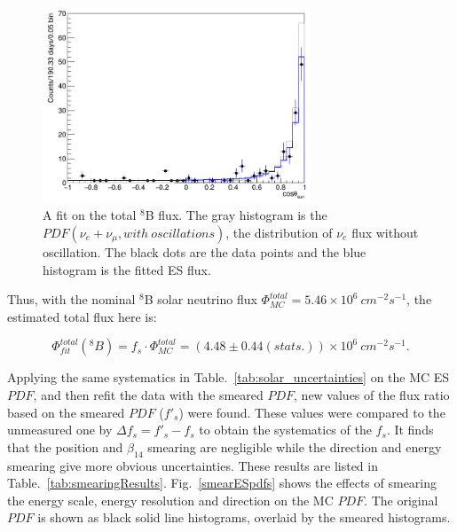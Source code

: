 \begin{figure}[!htb]
	\centering
	\includegraphics[width=8cm]{TOTALfluxFit.png}
	\caption[A fit on the total $^8$B flux.]{A fit on the total $^8$B flux. The gray histogram is the $PDF(\nu_e+\nu_\mu,with~oscillations)$, the distribution of $\nu_e$ flux without oscillation. The black dots are the data points and the blue histogram is the fitted ES flux.}
	\label{fig:TOTALfluxFit}
\end{figure}

Thus, with the nominal $^8$B solar neutrino flux $\Phi^{total}_{MC}=5.46\times 10^6~cm^{-2}s^{-1}$, the estimated total flux here is:

\begin{equation}
\Phi^{total}_{fit}(^8 B)=f_s\cdot \Phi^{total}_{MC}=(4.48\pm 0.44(stats.))\times 10^6~cm^{-2}s^{-1}.
\end{equation}

Applying the same systematics in Table.~\ref{tab:solar_uncertainties} on the MC ES $PDF$, and then refit the data with the smeared $PDF$, new values of the flux ratio based on the smeared $PDF$ ($f'_s$) were found. These values were compared to the unmeasured one by $\Delta f_s =f'_s-f_s$ to obtain the systematics of the $f_s$. It finds that the position and $\beta_{14}$ smearing are negligible while the direction and energy smearing give more obvious uncertainties. These results are listed in Table.~\ref{tab:smearingResults}. Fig.~\ref{smearESpdfs} shows the effects of smearing the energy scale, energy resolution and direction on the MC $PDF$. The original $PDF$ is shown as black solid line histograms, overlaid by the smeared histograms. 

